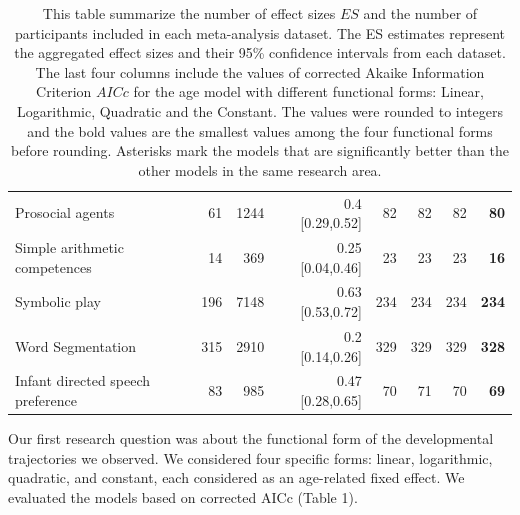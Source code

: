 \documentclass[10pt, letterpaper]{article}
\begin{document}
\begin{table}[ht]
\begin{tabular}{l|r|r|r|r|r|r|r}
Prosocial agents & 61 & 1244 & 0.4 [0.29,0.52] & 82 & 82 & 82 & \textbf{80}\\
Simple arithmetic competences & 14 & 369 & 0.25 [0.04,0.46] & 23 & 23 & 23 & \textbf{16}\\
Symbolic play & 196 & 7148 & 0.63 [0.53,0.72] & 234 & 234 & 234 & \textbf{234}\\
Word Segmentation & 315 & 2910 & 0.2 [0.14,0.26] & 329 & 329 & 329 & \textbf{328}\\
Infant directed speech preference & 83 & 985 & 0.47 [0.28,0.65] & 70 & 71 & 70 & \textbf{69}\\
\hline
\end{tabular}
\caption{\label{demo-table}This table summarize the number of effect sizes \(ES\) and the number of participants included in each meta-analysis dataset. The ES estimates represent the aggregated effect sizes and their 95\% confidence intervals from each dataset. The last four columns include the values of corrected Akaike Information Criterion \(AICc\) for the age model with different functional forms: Linear, Logarithmic, Quadratic and the Constant. The values were rounded to integers and the bold values are the smallest values among the four functional forms before rounding. Asterisks mark the models that are significantly better than the other models in the same research area.}
\end{table}

Our first research question was about the functional form of the
developmental trajectories we observed. We considered four specific
forms: linear, logarithmic, quadratic, and constant, each considered as
an age-related fixed effect. We evaluated the models based on corrected
AICc (Table 1).
\end{document}
